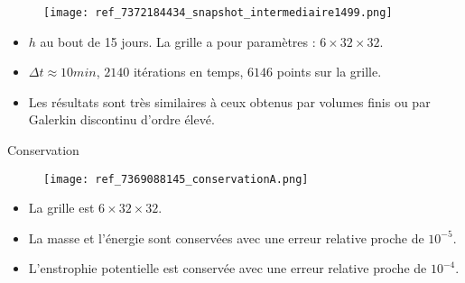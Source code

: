 \documentclass[11pt]{beamer}
\begin{document}


\begin{frame}{}
\begin{figure}
\texttt{[image: ref\_7372184434\_snapshot\_intermediaire1499.png]}
\end{figure}
\begin{itemize}
\item $h$ au bout de 15 jours. La grille a pour paramètres : $6 \times 32 \times 32$.
\item $\Delta t \approx 10min$, $2140$ itérations en temps, $6146$ points sur la grille.
\item Les résultats sont très similaires à ceux obtenus par volumes finis ou par Galerkin discontinu d'ordre élevé.
\end{itemize}
\end{frame}


\begin{frame}{Conservation}
\begin{figure}
\texttt{[image: ref\_7369088145\_conservationA.png]}
\end{figure}
\begin{itemize}
\item La grille est $6 \times 32 \times 32$.
\item La masse et l'énergie sont conservées avec une erreur relative proche de $10^{-5}$.
\item L'enstrophie potentielle est conservée avec une erreur relative proche de $10^{-4}$.
\end{itemize}
\end{frame}






























\end{document}
